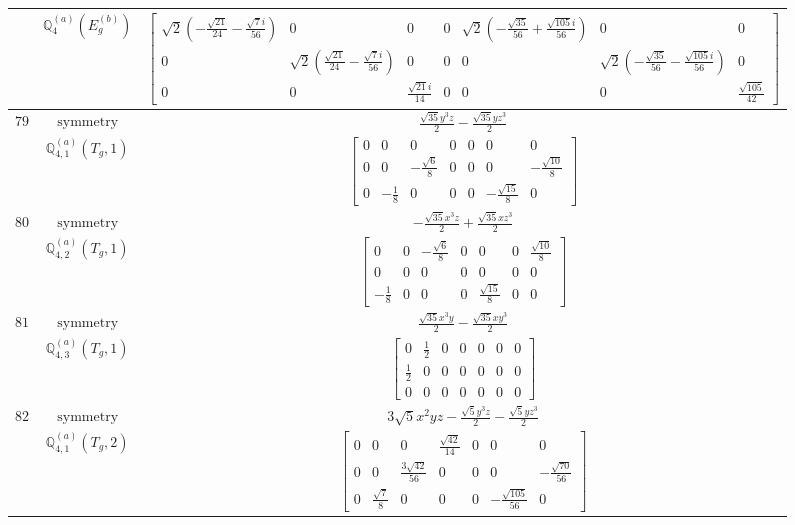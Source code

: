 \documentclass[fleqn,8pt,landscape]{jsarticle}
\begin{document}
\begin{longtable}{ccc}
$  $ & $ \mathbb{Q}_{4}^{(a)}(E_{g}^{(b)}) $ & $ \begin{bmatrix} \sqrt{2} \left(- \frac{\sqrt{21}}{24} - \frac{\sqrt{7} i}{56}\right) & 0 & 0 & 0 & \sqrt{2} \left(- \frac{\sqrt{35}}{56} + \frac{\sqrt{105} i}{56}\right) & 0 & 0 \\ 0 & \sqrt{2} \left(\frac{\sqrt{21}}{24} - \frac{\sqrt{7} i}{56}\right) & 0 & 0 & 0 & \sqrt{2} \left(- \frac{\sqrt{35}}{56} - \frac{\sqrt{105} i}{56}\right) & 0 \\ 0 & 0 & \frac{\sqrt{21} i}{14} & 0 & 0 & 0 & \frac{\sqrt{105}}{42} \end{bmatrix} $ \\ \hline
$ 79 $ & $ \text{symmetry} $ & $ \frac{\sqrt{35} y^{3} z}{2} - \frac{\sqrt{35} y z^{3}}{2} $ \\
$  $ & $ \mathbb{Q}_{4,1}^{(a)}(T_{g},1) $ & $ \begin{bmatrix} 0 & 0 & 0 & 0 & 0 & 0 & 0 \\ 0 & 0 & - \frac{\sqrt{6}}{8} & 0 & 0 & 0 & - \frac{\sqrt{10}}{8} \\ 0 & - \frac{1}{8} & 0 & 0 & 0 & - \frac{\sqrt{15}}{8} & 0 \end{bmatrix} $ \\ \hline
$ 80 $ & $ \text{symmetry} $ & $ - \frac{\sqrt{35} x^{3} z}{2} + \frac{\sqrt{35} x z^{3}}{2} $ \\
$  $ & $ \mathbb{Q}_{4,2}^{(a)}(T_{g},1) $ & $ \begin{bmatrix} 0 & 0 & - \frac{\sqrt{6}}{8} & 0 & 0 & 0 & \frac{\sqrt{10}}{8} \\ 0 & 0 & 0 & 0 & 0 & 0 & 0 \\ - \frac{1}{8} & 0 & 0 & 0 & \frac{\sqrt{15}}{8} & 0 & 0 \end{bmatrix} $ \\ \hline
$ 81 $ & $ \text{symmetry} $ & $ \frac{\sqrt{35} x^{3} y}{2} - \frac{\sqrt{35} x y^{3}}{2} $ \\
$  $ & $ \mathbb{Q}_{4,3}^{(a)}(T_{g},1) $ & $ \begin{bmatrix} 0 & \frac{1}{2} & 0 & 0 & 0 & 0 & 0 \\ \frac{1}{2} & 0 & 0 & 0 & 0 & 0 & 0 \\ 0 & 0 & 0 & 0 & 0 & 0 & 0 \end{bmatrix} $ \\ \hline
$ 82 $ & $ \text{symmetry} $ & $ 3 \sqrt{5} x^{2} y z - \frac{\sqrt{5} y^{3} z}{2} - \frac{\sqrt{5} y z^{3}}{2} $ \\
$  $ & $ \mathbb{Q}_{4,1}^{(a)}(T_{g},2) $ & $ \begin{bmatrix} 0 & 0 & 0 & \frac{\sqrt{42}}{14} & 0 & 0 & 0 \\ 0 & 0 & \frac{3 \sqrt{42}}{56} & 0 & 0 & 0 & - \frac{\sqrt{70}}{56} \\ 0 & \frac{\sqrt{7}}{8} & 0 & 0 & 0 & - \frac{\sqrt{105}}{56} & 0 \end{bmatrix} $ \\ \hline

\end{longtable}
\end{document}
